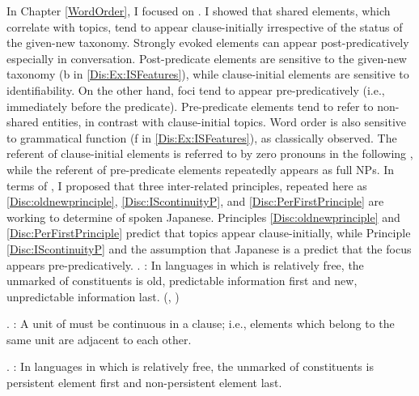 In Chapter \ref{WordOrder},
I focused on .
I showed that shared elements, which correlate with topics, tend to appear clause-initially irrespective of the status of the given-new taxonomy.
Strongly evoked elements can appear post-predicatively
especially in conversation.
Post-predicate elements are sensitive to the given-new taxonomy (b in \ref{Dis:Ex:ISFeatures}),
while clause-initial elements are sensitive to identifiability.
On the other hand, foci tend to appear pre-predicatively
(i.e., immediately before the predicate).
Pre-predicate elements tend to refer to non-shared entities,
in contrast with clause-initial topics.
Word order is also sensitive to grammatical function (f in \ref{Dis:Ex:ISFeatures}),
as classically observed.
The referent of clause-initial elements is referred to by zero pronouns in the following ,
while the referent of pre-predicate elements repeatedly appears as full NPs.
In terms of ,
I proposed that three inter-related principles, repeated here as \ref{Disc:oldnewprinciple}, \ref{Disc:IScontinuityP}, and \ref{Disc:PerFirstPrinciple} are working to determine  of spoken Japanese.
Principles \ref{Disc:oldnewprinciple} and \ref{Disc:PerFirstPrinciple}
predict that topics appear clause-initially,
while Principle \ref{Disc:IScontinuityP} and the assumption that Japanese is a  predict that
the focus appears pre-predicatively.
%
\ex. \label{Disc:oldnewprinciple}:
 In languages in which  is relatively free,
 the unmarked  of constituents is old,
 predictable information first and new, unpredictable information last.
 \hfill{(, )}

\ex. \label{Disc:IScontinuityP}:
 A unit of  must be continuous in a clause;
 i.e., elements which belong to the same unit are adjacent to each other.

\ex. \label{Disc:PerFirstPrinciple}:
 In languages in which  is relatively free,
 the unmarked  of constituents is persistent element first and non-persistent element last.

